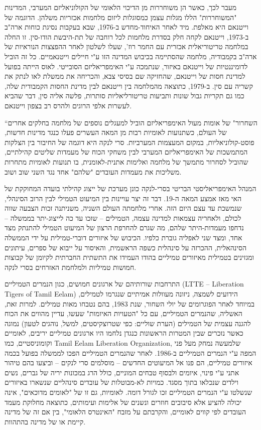 מעבר לכך, כאשר הן משוחררות מן הדיכוי הלאומי של הקולוניאליזם המערבי, המדינות "המשוחררות" הללו מגלות עצמן כמסוגלות ליזום מלחמות אכזריות משלהן. הדוגמה של וייטנאם היא מאלפת. מיד לאחר האיחוד-מחדש ב-1976, שבא בעקבות נסיגת כוחות ארה"ב ב-1973, וייטנאם לקחה חלק בסדרת מלחמות לכל רוחבה של תת-היבשת הודו-סין. זו החלה במלחמה טריטוריאלית אכזרית עם החמר רוז', שעלו לשלטון לאחר ההפצצות הנוראיות של ארה"ב בקמבודיה, מלחמה שהסתיימה בכיבוש המדינה הזו ע"י חיילים וייטנאמיים. כל זה הוביל לדומיננטיות של וייטנאם באיזור, שנתמכה ע"י האימפריאליזם הסובייטי. לאוס הייתה בפועל למדינת חסות של וייטנאם, שהחזיקה שם בסיסי צבא, והכריחה את ממשלת לאו לנתק את קשריה עם סין. ב-1979, כתוצאה מהמלחמה בין וייטנאם לבין מדינת החסות הקמבודית שלה, כמו גם תקריות גבול שונות ותביעות טריטורליאליות סותרות, פלשה אליה סין, דבר שהביא לעשרות אלפי הרוגים ולהרס רב בצפון וייטנאם.

“השחרור" של אומות מעול האימפריאליזם הוביל למעגלים נוספים של מלחמה בחלקים אחרים של העולם, כשתנועות לאומיות רבות מן המאה העשרים פעלו כנגד מדינות חדשות, פוסט-קולוניאליות, במקום המעצמות המערביות. סרי לנקה היא דוגמה של החיבור בין הצלקות המתמשכות של האימפריאליזם המערבי לבין משחקי הכוח של מעמדות שליטים קהילתיים, שהוביל לסחרור מתמשך של מלחמה ואלימות אתנית-לאומנית, בו תנועות לאומיות מתחרות משליכות את מעמדות העובדים "שלהם" אחד נגד השני שוב ושוב.

המנהל האימפריאליסטי הבריטי בסרי-לנקה כונן מערכת של ייצוג קהילתי בועדה המחוקקת של האי מאז אמצע המאה ה-19. דבר זה יצר עויינות בין המיעוט הטמילי לבין הרוב הסינהלי, שנמשכת עד עצם היום הזה. אחרי מלחמתה העולם השניה, משניתנה זכות הצבעה שווה לכולם, ולאחריה עצמאות למדינה עצמה, הטמילים – שזכו עד כה לייצוג-יתר בממשלה – נדחפו מעמדות-היתר שלהם, מה שגרם להחרפת הרצון של המיעוט הטמילי להתנתק מצד אחד, ומצד שני לאפליה גוברת כלפיו. הכיבוש של איזורים דוברי-טמילית על ידי הממשלה הסינהאלית, ההכרזה על סינהלית כשפה הראשמית, והאיסור על ייבוא של ספרים, עיתונים ומגזינים בטמילית מאיזורים טמיליים בהודו העמידו את התשתית החברתית לקיומן של קבוצות חמושות טמיליות ולמלחמת האזרחים בסרי לנקה.

התרחבות שורותיהם של ארגונים חמושים, כגון הנמרים הטמיליים (LTTE – Liberation Tigers of Tamil Eelam) הידועים לשמצה, ניזונה מעוולות אמיתיים שנגרמו לטמילים, במיוחד לאחר הפוגרומים של יולי השחור, שנת 1983, בהם נטבחו מאות טמילים. למרות זאת, האשליה, שהנמרים הטמיליים, עם כל "הטעויות האיומות" שעשו, עדיין מהווים את הכוח להגנה עצמית של הטמילים (הערת שוליים: כפי שטרוצקיסטים, למשל, נוהגים לטעון) נמוגה כאשר נזכרים שבין המטרות הראשונות כנגדן נלחמו היו ארגונים טמיליים יריבים, לאומיים וקומוניסטיים, כמו Tamil Eelam Liberation Organization, שלמעשה נמחק מעל פני המפה ע"י הנמרים הטמיליים ב-1986. לאחר שהנמרים הטמיליים הפכו לממשלה בפועל בכמה איזורים טמיליים, הם פנו אל המיעוטים החדשים – מוסלמים סרי לנקים – וביצעו בהם טיהור אתני ע"י פינוי, איומים ולבסוף טבחים המוניים, כולל הרג במכונות יריה של גברים, נשים וילדים שנכלאו בתוך מסגד. כמויות לא-מבוטלות של עובדים סינהליים שנשארו באיזורים שנשלטו ע"י הנמרים הטמיליים זכו לגורל דומה. לאומיות, גם זו של "לאומים מדוכאים", אינה יכולה להציע אלא סיבובים חוזרים ונשנים של אלימות ועימותים, כתוצאה מחלוקת מעמד העובדים לפי קווים לאומיים, והקרבתם על מזבח "האינטרס הלאומי", בין אם זה של מדינה קיימת או של מדינה בהתהוות.

